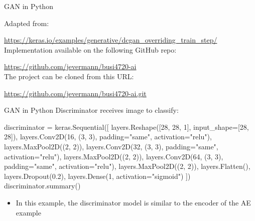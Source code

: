 \documentclass[ignorenonframetext,xcolor=x11names]{beamer}
\begin{document}




\begin{frame}{GAN in Python}

Adapted from: 

\small\url{https://keras.io/examples/generative/dcgan_overriding_train_step/}\normalsize \\

Implementation available on the following GitHub repo:

\small\url{https://github.com/jevermann/busi4720-ai}\normalsize \\

The project can be cloned from this URL:

\small\url{https://github.com/jevermann/busi4720-ai.git}\normalsize
\end{frame}


\begin{frame}[fragile]{GAN in Python}
Discriminator receives image to classify:

\begin{pythoncode}
discriminator = keras.Sequential([
    layers.Reshape([28, 28, 1], input_shape=[28, 28]),
    layers.Conv2D(16, (3, 3), 
        padding="same", activation="relu"),
    layers.MaxPool2D((2, 2)),
    layers.Conv2D(32, (3, 3), 
        padding="same", activation="relu"),
    layers.MaxPool2D((2, 2)),
    layers.Conv2D(64, (3, 3), 
        padding="same", activation="relu"),
    layers.MaxPool2D((2, 2)),
    layers.Flatten(),
    layers.Dropout(0.2),
    layers.Dense(1, activation="sigmoid")
])
discriminator.summary()
\end{pythoncode}
\begin{itemize}
   \item In this example, the discriminator model is similar to the encoder of the AE example
\end{itemize}
\end{frame}
\end{document}
